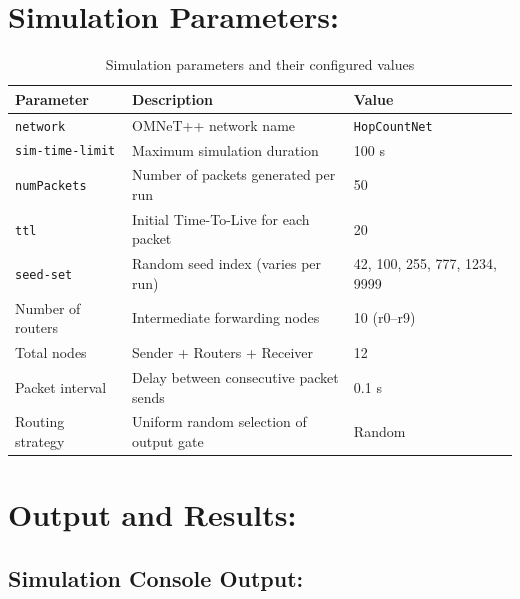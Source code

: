 \documentclass[12pt,a4paper]{article}
\begin{document}
\section{Simulation Parameters: }

\begin{table}[H]
\centering
\renewcommand{\arraystretch}{1.5}
\begin{tabularx}{\textwidth}{@{}lXl@{}}
\toprule
\textbf{Parameter} & \textbf{Description} & \textbf{Value} \\
\midrule
\texttt{network}          & OMNeT++ network name                          & \texttt{HopCountNet} \\
\texttt{sim-time-limit}   & Maximum simulation duration                   & 100 s \\
\texttt{numPackets}       & Number of packets generated per run           & 50 \\
\texttt{ttl}              & Initial Time-To-Live for each packet          & 20 \\
\texttt{seed-set}         & Random seed index (varies per run)            & 42, 100, 255, 777, 1234, 9999 \\
Number of routers         & Intermediate forwarding nodes                 & 10 (r0--r9) \\
Total nodes               & Sender + Routers + Receiver                   & 12 \\
Packet interval           & Delay between consecutive packet sends        & 0.1 s \\
Routing strategy          & Uniform random selection of output gate       & Random \\
\bottomrule
\end{tabularx}
\caption{Simulation parameters and their configured values}
\end{table}

\vspace{0.5cm}
\section{Output and Results: }

\subsection{Simulation Console Output: }
\end{document}
